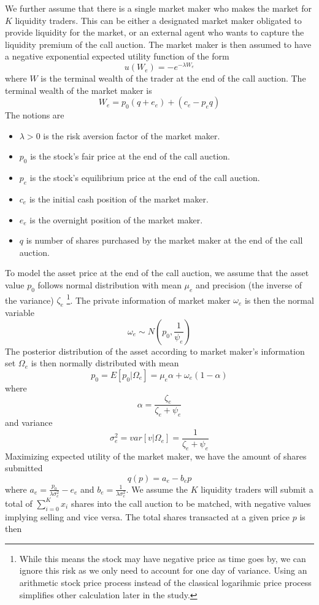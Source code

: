 \documentclass{article}
\begin{document}
We further assume that there is a single market maker who makes the market for $K$ liquidity traders. This can be either a designated market maker obligated to provide liquidity for the market, or an external agent who wants to capture the liquidity premium of the call auction. The market maker is then assumed to have a negative exponential expected utility function of the form
\[
  u(W_e) = -e^{-\lambda W_e}
\]
where $W$ is the terminal wealth of the trader at the end of the call auction. The terminal wealth of the market maker is
\[
  W_e = p_0 (q + e_e) + (c_e - p_e q)
\]
The notions are
\begin{itemize}
  \item $\lambda>0$ is the risk aversion factor of the market maker.
  \item $p_0$ is the stock's fair price at the end of the call auction.
  \item $p_e$ is the stock's equilibrium price at the end of the call auction.
  \item $c_e$ is the initial cash position of the market maker.
  \item $e_e$ is the overnight position of the market maker.
  \item $q$ is number of shares purchased by the market maker at the end of the call auction.
\end{itemize}
To model the asset price at the end of the call auction, we assume that the asset value $p_0$ follows normal distribution with mean $\mu_e$ and precision (the inverse of the variance) $\zeta_e$ \footnote{While this means the stock may have negative price as time goes by, we can ignore this risk as we only need to account for one day of variance. Using an arithmetic stock price process instead of the classical logarihmic price process simplifies other calculation later in the study.}. The private information of market maker $\omega_e$ is then the normal variable
\[
  \omega_e \sim N(p_0, \frac{1}{\psi_e})
\]
The posterior distribution of the asset according to market maker's information set $\Omega_e$ is then normally distributed with mean
\[
  p_0=E[p_0|\Omega_e]=\mu_e \alpha + \omega_e(1 - \alpha)
\]
where
\[
  \alpha = \frac{\zeta_e}{\zeta_e+\psi_e}
\]
and variance
\[
  \sigma_e^2=var[v|\Omega_e]=\frac{1}{\zeta_e+\psi_e}
\]
Maximizing expected utility of the market maker, we have the amount of shares submitted
\begin{equation}\label{eqn:mm_eval_eqb}
  q(p) = a_e - b_e p
\end{equation}
where $a_e = \frac{p_0}{\lambda \sigma_e^2} - e_e$ and $b_e=\frac{1}{\lambda \sigma_e^2}$. We assume the $K$ liquidity traders will submit a total of $\sum_{i=0}^K x_i$ shares into the call auction to be matched, with negative values implying selling and vice versa. The total shares transacted at a given price $p$ is then
\end{document}
